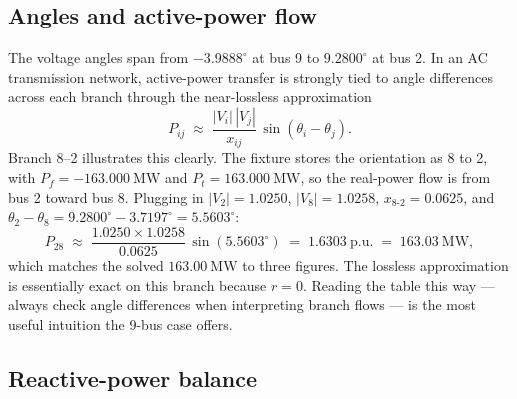 \documentclass[11pt]{article}
\newcommand{\pu}{\mathrm{p.u.}}
\newcommand{\MW}{\mathrm{MW}}
\begin{document}
\subsection{Angles and active-power flow}

The voltage angles span from $-3.9888^\circ$ at bus 9 to $9.2800^\circ$
at bus 2. In an AC transmission network, active-power transfer is
strongly tied to angle differences across each branch through the
near-lossless approximation
\[
  P_{ij} \;\approx\; \frac{|V_i|\,|V_j|}{x_{ij}}\,\sin(\theta_i - \theta_j).
\]
Branch 8--2 illustrates this clearly. The fixture stores the orientation
as 8 to 2, with $P_f = -163.000~\MW$ and $P_t = 163.000~\MW$, so the
real-power flow is from bus 2 toward bus 8. Plugging in
$|V_2| = 1.0250$, $|V_8| = 1.0258$, $x_{8\text{-}2} = 0.0625$, and
$\theta_2 - \theta_8 = 9.2800^\circ - 3.7197^\circ = 5.5603^\circ$:
\[
  P_{28} \;\approx\; \frac{1.0250 \times 1.0258}{0.0625}\,
  \sin(5.5603^\circ) \;=\; 1.6303~\pu \;=\; 163.03~\MW,
\]
which matches the solved $163.00~\MW$ to three figures. The lossless
approximation is essentially exact on this branch because $r = 0$.
Reading the table this way --- always check angle differences when
interpreting branch flows --- is the most useful intuition the
9-bus case offers.

\subsection{Reactive-power balance}
\end{document}
